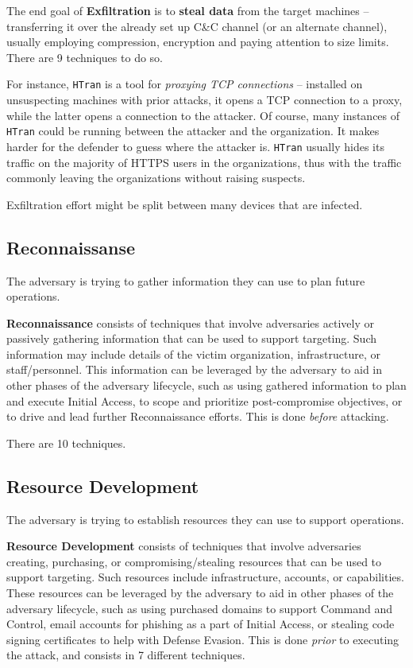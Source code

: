 \documentclass[10pt]{extbook}
\begin{document}
The end goal of \textbf{Exfiltration} is to \textbf{steal data} from the target
machines -- transferring it over the already set up C\&C channel (or an
alternate channel), usually employing compression, encryption and paying
attention to size limits. There are 9 techniques to do so.

For instance, \texttt{HTran} is a tool for \emph{proxying TCP connections} --
installed on unsuspecting machines with prior attacks, it opens a TCP
connection to a proxy, while the latter opens a connection to the attacker. Of
course, many instances of \texttt{HTran} could be running between the attacker
and the organization. It makes harder for the defender to guess where the
attacker is. \texttt{HTran} usually hides its traffic on the majority of HTTPS
users in the organizations, thus with the traffic commonly leaving the
organizations without raising suspects. 

Exfiltration effort might be split between many devices that are
infected.

\subsection{Reconnaissanse}

The adversary is trying to gather information they can use to plan future
operations.

\textbf{Reconnaissance} consists of techniques that involve adversaries
actively or passively gathering information that can be used to support
targeting. Such information may include details of the victim organization,
infrastructure, or staff/personnel. This information can be leveraged by the
adversary to aid in other phases of the adversary lifecycle, such as using
gathered information to plan and execute Initial Access, to scope and
prioritize post-compromise objectives, or to drive and lead further
Reconnaissance efforts. This is done \emph{before} attacking.

There are 10 techniques.

\subsection{Resource Development}

The adversary is trying to establish resources they can use to support
operations.

\textbf{Resource Development} consists of techniques that involve adversaries
creating, purchasing, or compromising/stealing resources that can be used to
support targeting. Such resources include infrastructure, accounts, or
capabilities. These resources can be leveraged by the adversary to aid in other
phases of the adversary lifecycle, such as using purchased domains to support
Command and Control, email accounts for phishing as a part of Initial Access,
or stealing code signing certificates to help with Defense Evasion. This is
done \emph{prior} to executing the attack, and consists in 7 different
techniques.
\end{document}
